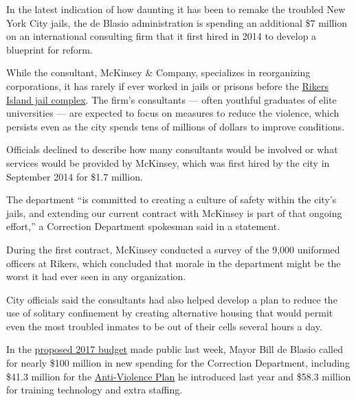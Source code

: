 In the latest indication of how daunting it has been to remake the
troubled New York City jails, the de Blasio administration is spending
an additional \$7 million on an international consulting firm that it
first hired in 2014 to develop a blueprint for reform.

While the consultant, McKinsey \& Company, specializes in reorganizing
corporations, it has rarely if ever worked in jails or prisons before
the
\href{http://topics.nytimes3xbfgragh.onion/top/reference/timestopics/organizations/r/rikers_island_prison_complex/index.html?8qa}{Rikers
Island jail complex}. The firm's consultants --- often youthful
graduates of elite universities --- are expected to focus on measures to
reduce the violence, which persists even as the city spends tens of
millions of dollars to improve conditions.

Officials declined to describe how many consultants would be involved or
what services would be provided by McKinsey, which was first hired by
the city in September 2014 for \$1.7 million.

The department ``is committed to creating a culture of safety within the
city's jails, and extending our current contract with McKinsey is part
of that ongoing effort,'' a Correction Department spokesman said in a
statement.

During the first contract, McKinsey conducted a survey of the 9,000
uniformed officers at Rikers, which concluded that morale in the
department might be the worst it had ever seen in any organization.

City officials said the consultants had also helped develop a plan to
reduce the use of solitary confinement by creating alternative housing
that would permit even the most troubled inmates to be out of their
cells several hours a day.

In the
\href{http://www.nytimes3xbfgragh.onion/2016/01/22/nyregion/mayor-bill-de-blasio-budget-plan-new-york-city.html?rref=collection\%2Ftimestopic\%2Fde\%20Blasio\%2C\%20Bill\&action=click\&contentCollection=timestopics\&region=stream\&module=stream_unit\&version=latest\&contentPlacement=10\&pgtype=collection}{proposed
2017 budget} made public last week, Mayor Bill de Blasio called for
nearly \$100 million in new spending for the Correction Department,
including \$41.3 million for the
\href{http://www.nytimes3xbfgragh.onion/2015/03/13/nyregion/rikers-island-mayor-de-blasio-plan-curtail-violence.html?_r=0}{Anti-Violence
Plan} he introduced last year and \$58.3 million for training technology
and extra staffing.

